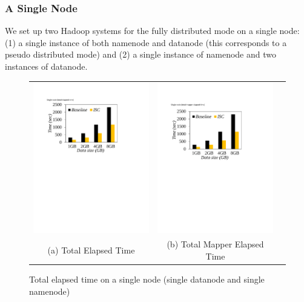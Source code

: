 \subsubsection{A Single Node}\label{subsubsec:Exp_result_singlenode}
We set up two Hadoop systems for the fully distributed mode on a single node: (1) a single instance of both namenode and datanode (this corresponds to a pseudo distributed mode) and (2) a single instance of namenode and two instances of datanode. 








\begin{figure}[t]
  \centering
  \renewcommand{\tabcolsep}{0.1mm}
  \begin{tabular}{ccc}
 \includegraphics[width=0.5\columnwidth]{figures/Singlenode_Total_Elapsed_Time.pdf}&
  \includegraphics[width=0.5\columnwidth]{figures/Singlenode_Total_Mapper_Elapsed_Time.pdf}\\
  (a) Total Elapsed Time & (b) Total Mapper Elapsed Time
\end{tabular}
  \caption{Total elapsed time on a single node (single datanode and single namenode)}
  \label{fig:execution_time_with_single_namenode_on_single_node}
 \end{figure}






